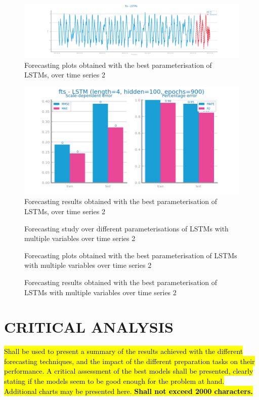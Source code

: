 \documentclass[10pt]{extarticle}
\newcommand{\ctext}[3][RGB]{%
  \begingroup
  \definecolor{hlcolor}{#1}{#2}\sethlcolor{hlcolor}%
  \hl{#3}%
  \endgroup
}
\begin{document}
\begin{figure}[H]
\centering\includegraphics[scale=0.4]{images/dataset2/time_series/fts_lstms_R2_forecast.png}
\caption{Forecasting plots obtained with the best parameterisation of LSTMs, over time series 2}
\end{figure}

\begin{figure}[H]
\centering\includegraphics[scale=0.5]{images/dataset2/time_series/fts_lstms_R2_eval.png}
\caption{Forecasting results obtained with the best parameterisation of LSTMs, over time series 2}
\end{figure}

\begin{figure}[H]
\caption{Forecasting study over different parameterisations of LSTMs with multiple variables over time series 2}
\end{figure}

\begin{figure}[H]
\caption{Forecasting plots obtained with the best parameterisation of LSTMs with multiple variables over time series 2}
\end{figure}

\begin{figure}[H]
\caption{Forecasting results obtained with the best parameterisation of LSTMs with multiple variables over time series 2}
\end{figure}

\section{CRITICAL ANALYSIS}
\ctext[RGB]{190,190,190}{Shall be used to present a summary of the results achieved with the different forecasting techniques, and the impact of the different preparation tasks on their performance. A critical assessment of the best models shall be presented, clearly stating if the models seem to be good enough for the problem at hand. Additional charts may be presented here.  \textbf{Shall not exceed 2000 characters.}}
\end{document}
